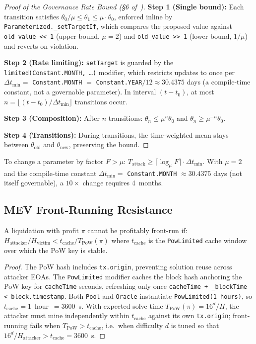 \documentclass[10pt,a4paper,twocolumn]{article}
\begin{document}
\begin{proof}[Proof of the Governance Rate Bound (\S6 of~\cite{wp})]
\textbf{Step 1 (Single bound):} Each transition satisfies $\theta_0/\mu \leq \theta_1 \leq \mu \cdot \theta_0$, enforced inline by \texttt{Parameterized.\_setTargetIf}, which compares the proposed value against \texttt{old\_value <{}< 1} (upper bound, $\mu = 2$) and \texttt{old\_value >{}> 1} (lower bound, $1/\mu$) and reverts on violation.

\textbf{Step 2 (Rate limiting):} \texttt{setTarget} is guarded by the \texttt{limited(Constant.MONTH, \dots)} modifier, which restricts updates to once per $\Delta t_{\min} = $ \texttt{Constant.MONTH} $= $ \texttt{Constant.YEAR}$/12 \approx 30.4375$ days (a compile-time constant, not a governable parameter). In interval $(t{-}t_0)$, at most $n = \lfloor(t{-}t_0)/\Delta t_{\min}\rfloor$ transitions occur.

\textbf{Step 3 (Composition):} After $n$ transitions: $\theta_n \leq \mu^n \theta_0$ and $\theta_n \geq \mu^{-n} \theta_0$.

\textbf{Step 4 (Transitions):} During transitions, the time-weighted mean stays between $\theta_{\text{old}}$ and $\theta_{\text{new}}$, preserving the bound.
\end{proof}

\begin{corollary}
To change a parameter by factor $F > \mu$: $T_{\text{attack}} \geq \lceil\log_\mu F\rceil \cdot \Delta t_{\min}$. With $\mu = 2$ and the compile-time constant $\Delta t_{\min} = $ \texttt{Constant.MONTH} $\approx 30.4375$ days (not itself governable), a $10\times$ change requires 4~months.
\end{corollary}

\subsection{MEV Front-Running Resistance}

\begin{theorem}
\label{thm:mev}
A liquidation with profit $\pi$ cannot be profitably front-run if:
$H_{\text{attacker}}/H_{\text{victim}} < t_{\text{cache}}/T_{\text{PoW}}(\pi)$
where $t_{\text{cache}}$ is the \texttt{PowLimited} cache window over which the PoW key is stable.
\end{theorem}

\begin{proof}
The PoW hash includes \texttt{tx.origin}, preventing solution reuse across attacker EOAs. The \texttt{PowLimited} modifier caches the block hash anchoring the PoW key for \texttt{cacheTime} seconds, refreshing only once \texttt{cacheTime + \_blockTime < block.timestamp}. Both \texttt{Pool} and \texttt{Oracle} instantiate \texttt{PowLimited(1 hours)}, so $t_{\text{cache}} = 1$~hour~$= 3600$~s. With expected solve time $T_{\text{PoW}}(\pi) = 16^d / H$, the attacker must mine independently within $t_{\text{cache}}$ against its own \texttt{tx.origin}; front-running fails when $T_{\text{PoW}} > t_{\text{cache}}$, i.e.\ when difficulty $d$ is tuned so that $16^d / H_{\text{attacker}} > t_{\text{cache}} = 3600$~s.
\end{proof}
\end{document}
